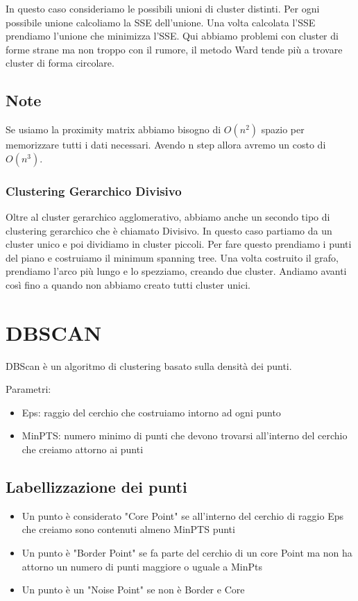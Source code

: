 \documentclass[14pt]{extreport}
\begin{document}
In questo caso consideriamo le possibili unioni di cluster distinti. Per ogni possibile unione calcoliamo la SSE dell'unione. Una volta calcolata l'SSE prendiamo l'unione che minimizza l'SSE.
Qui abbiamo problemi con cluster di forme strane ma non troppo con il rumore, il metodo Ward tende più a trovare cluster di forma circolare.

\section{Note}

Se usiamo la proximity matrix abbiamo bisogno di $O(n^2)$ spazio per memorizzare tutti i dati necessari.
Avendo n step allora avremo un costo di $O(n^3)$.

\subsection{Clustering Gerarchico Divisivo}

Oltre al cluster gerarchico agglomerativo, abbiamo anche un secondo tipo di clustering gerarchico che è chiamato Divisivo.
In questo caso partiamo da un cluster unico e poi dividiamo in cluster piccoli.
Per fare questo prendiamo i punti del piano e costruiamo il minimum spanning tree. Una volta costruito il grafo, prendiamo l'arco più lungo e lo spezziamo, creando due cluster. Andiamo avanti così fino a quando non abbiamo creato tutti cluster unici.

\chapter{DBSCAN}

DBScan è un algoritmo di clustering basato sulla densità dei punti.

Parametri:

\begin{itemize}
    \item Eps: raggio del cerchio che costruiamo intorno ad ogni punto
    \item MinPTS: numero minimo di punti che devono trovarsi all'interno del cerchio che creiamo attorno ai punti 
\end{itemize}

\section{Labellizzazione dei punti}

\begin{itemize}
    \item Un punto è considerato "Core Point" se all'interno del cerchio di raggio Eps che creiamo sono contenuti almeno MinPTS punti
    \item Un punto è "Border Point" se fa parte del cerchio di un core Point ma non ha attorno un numero di punti maggiore o uguale a MinPts
    \item Un punto è un "Noise Point" se non è Border e Core
\end{itemize}
\end{document}
